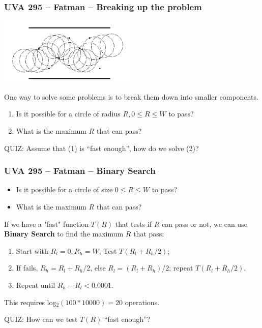 \begin{frame}
  \frametitle{UVA 295 -- Fatman -- Breaking up the problem}
  \begin{center}
    \includegraphics[width=0.5\textwidth]{img/fatman}
  \end{center}

  One way to solve some problems is to break them down into smaller
  components.

  \begin{block}{}
  \begin{enumerate}
  \item Is it possible for a circle of radius $R, 0 \leq R \leq W$ to pass?
  \item What is the maximum $R$ that can pass?
  \end{enumerate}
  \end{block}

  \alert{QUIZ}: Assume that (1) is ``fast enough'', how do we solve (2)?
\end{frame}

\begin{frame}
  \frametitle{UVA 295 -- Fatman -- Binary Search}

    \begin{block}{}
      \begin{itemize}
      \item Is it possible for a circle of size $0 \leq R \leq W$ to pass?
      \item What is the maximum $R$ that can pass?
      \end{itemize}
    \end{block}

    If we have a "fast" function $T(R)$ that tests if $R$ can pass or not, we can use {\bf Binary Search} to find the maximum $R$ that pass:

    \bigskip

    \begin{enumerate}
    \item Start with $R_l = 0, R_h = W$, Test $T(R_l+R_h /2)$;
    \item If fails, $R_h = R_l+R_h/2$, else $R_l = (R_l+R_h)/2$; repeat $T(R_l+R_h/2)$.
    \item Repeat until $R_h - R_l < 0.0001$.
    \end{enumerate}

    This requires log$_2(100*10000) = 20$ operations.

    \bigskip

    \alert{QUIZ:} How can we test $T(R)$ ``fast enough''?
\end{frame}

